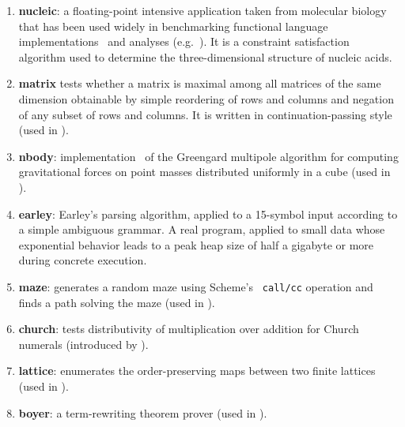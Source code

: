 \documentclass[preprint,onecolumn,9pt]{sigplanconf} %
\begin{document}
\begin{enumerate}  %

\item {\bf nucleic}: a floating-point intensive application taken from
  molecular biology that has been used widely in benchmarking
  functional language
  implementations~\cite{dvanhorn:Hartel1996Benchmarking} and analyses
  (e.g.~\cite{dvanhorn:wright-jagannathan-toplas98,dvanhorn:jagannathan-etal-popl98}).
  It is a constraint satisfaction algorithm used to determine the
  three-dimensional structure of nucleic acids.

\item {\bf matrix} tests whether a matrix is maximal among all
  matrices of the same dimension obtainable by simple reordering of
  rows and columns and negation of any subset of rows and columns.  It
  is written in continuation-passing style (used in
  \cite{dvanhorn:wright-jagannathan-toplas98,dvanhorn:jagannathan-etal-popl98}).


\item {\bf nbody}: implementation~\cite{ianjohnson:nbody87} of the
  Greengard multipole algorithm for computing gravitational forces on
  point masses distributed uniformly in a cube (used in
  \cite{dvanhorn:wright-jagannathan-toplas98,dvanhorn:jagannathan-etal-popl98}).

\item {\bf earley}: Earley's parsing algorithm, applied to a 15-symbol
  input according to a simple ambiguous grammar.  A real program,
  applied to small data whose exponential behavior leads to a peak
  heap size of half a gigabyte or more during concrete execution.

\item {\bf maze}: generates a random maze using Scheme's {\tt
  call/cc} operation and finds a path solving
  the maze (used in
  \cite{dvanhorn:wright-jagannathan-toplas98,dvanhorn:jagannathan-etal-popl98}).

\item {\bf church}: tests distributivity of multiplication over
  addition for Church numerals (introduced by
  \cite{dvanhorn:Vardoulakis2011CFA2}).

\item {\bf lattice}: enumerates the order-preserving maps between two
  finite lattices (used in
  \cite{dvanhorn:wright-jagannathan-toplas98,dvanhorn:jagannathan-etal-popl98}).

\item {\bf boyer}: a term-rewriting theorem prover (used in
  \cite{dvanhorn:wright-jagannathan-toplas98,dvanhorn:jagannathan-etal-popl98}).


\end{enumerate}
\end{document}
